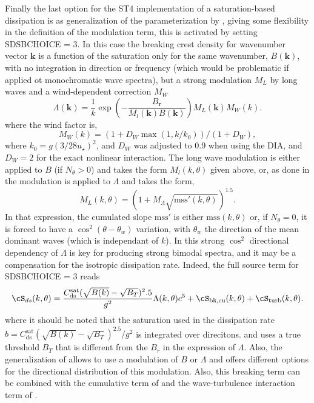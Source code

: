 Finally the last option for the ST4 implementation of a saturation-based dissipation is as generalization 
of the parameterization by \citet{Romero2019}, giving some flexibility in the definition of the modulation 
term, this is activated by setting  {\F  SDSBCHOICE  = 3}. In this case the  breaking crest density for wavenumber vector  
$\mathbf{k}$ is a function of the saturation only for the same wavenumber, $B(\mathbf{k})$, with no integration in direction 
or frequency (which would be problematic if applied ot monochromatic wave spectra), but a strong modulation $M_L$  by long waves
and a wind-dependent correction $M_W$
\begin{equation}
\Lambda (\mathbf{k}) = \frac{1}{k} \exp \left(-\frac{B_{\mathbf{r}}}{M_l(\mathbf{k})  B(\mathbf{k})}\right) M_L(\mathbf{k}) M_W(k).
\end{equation}
where the wind factor is, 
\begin{equation}
 M_W(k)=\left( 1+ D_W  \max(1,k/k_0) \right) / (1+D_W),
\end{equation}
where $k_0=g (3/ 28 u_\star)^2$, and $D_W$ was adjusted to 0.9 when using the DIA, and $D_W=2$ for the exact nonlinear interaction.
The long wave modulation is either applied to $B$ (if $N_\theta > 0$) and takes the form $ M_l(k,\theta)$ given above, 
or, as done in \cite{Romero2019} the modulation is applied to  $\Lambda$ and takes the form, 
\begin{equation}
 M_L(k,\theta)=\left( 1+ M_\Lambda \sqrt{\mathrm{mss}'(k,\theta)}  \right)^{1.5}.
\end{equation}
In that expression, the cumulated slope $\mathrm{mss}'$ is either $\mathrm{mss}(k,\theta)$ or, if $N_\theta=0$, it is forced to have a $\cos^2 (\theta-\theta_w)$ variation, 
with $\theta_w$ the direction of the mean dominant waves (which is independant of $k$). In \cite{Romero2019} this strong $\cos^2$ directional dependency of $\Lambda$ is key for producing 
strong bimodal spectra, and it may be a compensation for the isotropic dissipation rate. Indeed, the full source term for {\F  SDSBCHOICE  = 3} reads 
\begin{eqnarray}
\cS_{ds}(k,\theta)=  \frac{C_{\mathrm{ds}}^{\mathrm{sat}} (\sqrt{B(k)}-\sqrt{B_T} )^2.5}{g^2} \Lambda (k,\theta) c^5 + \cS_{\mathrm{bk,cu}}(k,\theta) + \cS_{\mathrm{turb}}(k,\theta) \label{Sds_all}. \nonumber \\
\end{eqnarray}
where it should be noted that the saturation used in the dissipation rate $b=C_{\mathrm{ds}}^{\mathrm{sat}} (\sqrt{B(k)}-\sqrt{B_T} )^2.5/{g^2}$ is integrated over direcitons. and uses a true threshold $B_T$ that is different from the $B_r$ in the expression of $\Lambda$. 
Also, the generalization of \cite{Romero2019} allows to use a modulation of $B$ or $\Lambda$ and offers different options for the directional distribution of this modulation. Also, this breaking term can be combined with the cumulative term of \cite{art:Aea10} and the wave-turbulence interaction term of \citet{art:AJ06}. 

